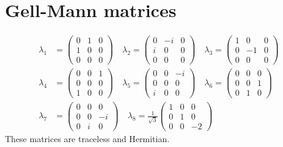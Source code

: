 \documentclass[11pt,a4paper]{article}
\begin{document}
\section{Gell-Mann matrices}
\begin{align*}
\lambda_1 &= \begin{pmatrix} 0 & 1 & 0 \\ 1 & 0 & 0 \\ 0 & 0 & 0 \end{pmatrix}
\quad \lambda_2 = \begin{pmatrix} 0 & -i & 0 \\ i & 0 & 0 \\ 0 & 0 & 0 \end{pmatrix}
\quad \lambda_3 = \begin{pmatrix} 1 & 0 & 0 \\ 0 & -1 & 0 \\ 0 & 0 & 0 \end{pmatrix}\\
\lambda_4 &= \begin{pmatrix} 0 & 0 & 1 \\ 0 & 0 & 0 \\ 1 & 0 & 0 \end{pmatrix} \quad
\lambda_5 = \begin{pmatrix} 0 & 0 & -i \\ 0 & 0 & 0 \\ i & 0 & 0 \end{pmatrix} \quad
\lambda_6 = \begin{pmatrix} 0 & 0 & 0 \\ 0 & 0 & 1 \\ 0 & 1 & 0 \end{pmatrix} \\
\lambda_7 &= \begin{pmatrix} 0 & 0 & 0 \\ 0 & 0 & -i \\ 0 & i & 0 \end{pmatrix} \quad
\lambda_8 = \frac{1}{\sqrt{3}} \begin{pmatrix} 1 & 0 & 0 \\ 0 & 1 & 0 \\ 0 & 0 & -2 \end{pmatrix}
\end{align*}
These matrices are traceless and Hermitian.
\end{document}
